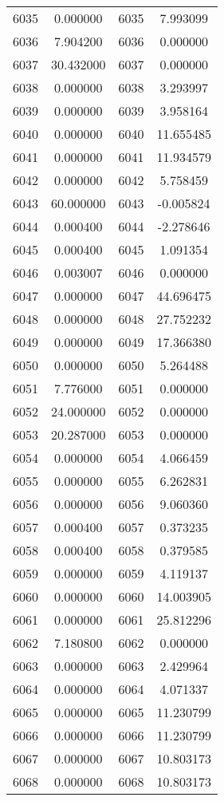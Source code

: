 \documentclass[12pt]{article}
\begin{document}
\begin{longtable}{@{}cccc@{}}
6035 & 0.000000 & 6035 & 7.993099 \\
6036 & 7.904200 & 6036 & 0.000000 \\
6037 & 30.432000 & 6037 & 0.000000 \\
6038 & 0.000000 & 6038 & 3.293997 \\
6039 & 0.000000 & 6039 & 3.958164 \\
6040 & 0.000000 & 6040 & 11.655485 \\
6041 & 0.000000 & 6041 & 11.934579 \\
6042 & 0.000000 & 6042 & 5.758459 \\
6043 & 60.000000 & 6043 & -0.005824 \\
6044 & 0.000400 & 6044 & -2.278646 \\
6045 & 0.000400 & 6045 & 1.091354 \\
6046 & 0.003007 & 6046 & 0.000000 \\
6047 & 0.000000 & 6047 & 44.696475 \\
6048 & 0.000000 & 6048 & 27.752232 \\
6049 & 0.000000 & 6049 & 17.366380 \\
6050 & 0.000000 & 6050 & 5.264488 \\
6051 & 7.776000 & 6051 & 0.000000 \\
6052 & 24.000000 & 6052 & 0.000000 \\
6053 & 20.287000 & 6053 & 0.000000 \\
6054 & 0.000000 & 6054 & 4.066459 \\
6055 & 0.000000 & 6055 & 6.262831 \\
6056 & 0.000000 & 6056 & 9.060360 \\
6057 & 0.000400 & 6057 & 0.373235 \\
6058 & 0.000400 & 6058 & 0.379585 \\
6059 & 0.000000 & 6059 & 4.119137 \\
6060 & 0.000000 & 6060 & 14.003905 \\
6061 & 0.000000 & 6061 & 25.812296 \\
6062 & 7.180800 & 6062 & 0.000000 \\
6063 & 0.000000 & 6063 & 2.429964 \\
6064 & 0.000000 & 6064 & 4.071337 \\
6065 & 0.000000 & 6065 & 11.230799 \\
6066 & 0.000000 & 6066 & 11.230799 \\
6067 & 0.000000 & 6067 & 10.803173 \\
6068 & 0.000000 & 6068 & 10.803173 \\

\end{longtable}
\end{document}
